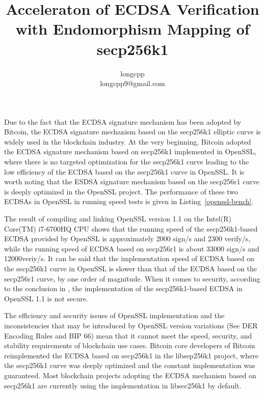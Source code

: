 \documentclass{article}
\begin{document}
\title{ Acceleraton of ECDSA Verification with Endomorphism Mapping of  secp256k1}
\author{longcpp \\ \small{longcpp9@gmail.com}}

\maketitle

Due to the fact that the ECDSA signature mechanism has been adopted by Bitcoin, 
the ECDSA signature mechanism based on the secp256k1 elliptic curve is widely used in the blockchain industry. 
At the very beginning, Bitcoin adopted the ECDSA signature mechanism based on secp256k1 implemented in OpenSSL,
where there is no targeted optimization for the secp256k1 curve 
leading to the low efficiency of the ECDSA based on the secp256k1 curve in OpenSSL. 
It is worth noting that the ESDSA signature mechanism based on the secp256r1 curve is deeply optimized in the OpenSSL project. The performance of these two ECDSAs in OpenSSL in running speed tests is given in Listing~\ref{openssl-bench}.



The result of compiling and linking OpenSSL version 1.1 on the Intel(R) Core(TM) i7-6700HQ CPU shows that 
the running speed of the secp256k1-based ECDSA provided by OpenSSL is approximately 2000 sign/s and 2300 verify/s, 
while the running speed of ECDSA based on secp256r1 is about 33000 sign/s and 12000veriy/s. 
It can be said that the implementation speed of ECDSA based on the secp256k1 curve in OpenSSL 
is slower than that of the ECDSA based on the secp256r1 curve, by one order of magnitude. 
When it comes to security, according to the conclusion in \cite{ecdsa-side-channel}, 
the implementation of the secp256k1-based ECDSA in OpenSSL 1.1 is not secure.

The efficiency and security issues of OpenSSL implementation and the inconsistencies that 
may be introduced by OpenSSL version variations (See DER Encoding Rules and BIP 66) mean that 
it cannot meet the speed, security, and stability requirements of blockchain use cases. 
Bitcoin core developers of Bitcoin reimplemented the ECDSA based on secp256k1 in the libsep256k1 project, 
where the secp256k1 curve was deeply optimized and the constant implementation was guaranteed. 
Most blockchain projects adopting the ECDSA mechanism based on secp256k1 are currently using the implementation in libsec256k1 by default.
\end{document}
